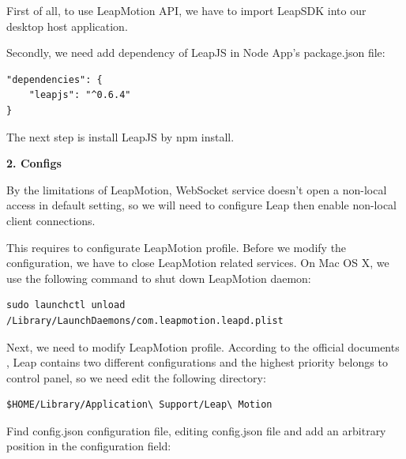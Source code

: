 First of all, to use LeapMotion API, we have to import LeapSDK into our desktop host application.

Secondly, we need add dependency of LeapJS in Node App's package.json file:
\begin{lstlisting}[frame=trBL,frameround=fttt,rulesepcolor=\color{white},numbers=none]
"dependencies": {
    "leapjs": "^0.6.4"
}
\end{lstlisting}

The next step is install LeapJS by npm install.

\textbf{2. Configs}

By the limitations of LeapMotion\cite{Leap:2016}, WebSocket service doesn't open a non-local access in default setting, so we will need to configure Leap then enable non-local client connections.

This requires to configurate LeapMotion profile. Before we modify the configuration, we have to close LeapMotion related services. On Mac OS X, we use the following command to shut down LeapMotion daemon:

\begin{lstlisting}[frame=trBL,frameround=fttt,rulesepcolor=\color{white},numbers=none]
sudo launchctl unload /Library/LaunchDaemons/com.leapmotion.leapd.plist
\end{lstlisting}

Next, we need to modify LeapMotion profile. According to the official documents , Leap contains two different configurations and the highest priority belongs to control panel, so we need edit the following directory:

\begin{lstlisting}[frame=trBL,frameround=fttt,rulesepcolor=\color{white},numbers=none]
$HOME/Library/Application\ Support/Leap\ Motion
\end{lstlisting}

Find config.json configuration file, editing config.json file and add an arbitrary position in the configuration field:

